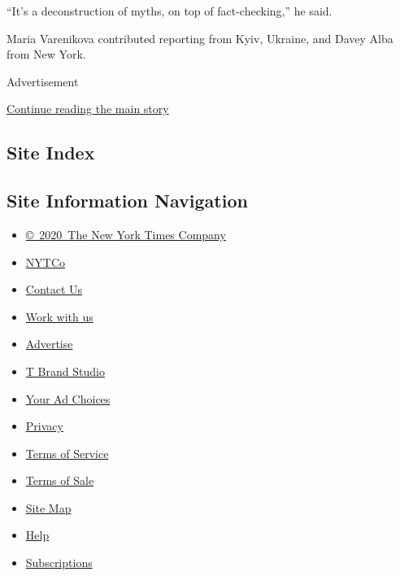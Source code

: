 ``It's a deconstruction of myths, on top of fact-checking,'' he said.

Maria Varenikova contributed reporting from Kyiv, Ukraine, and Davey
Alba from New York.

Advertisement

\protect\hyperlink{after-bottom}{Continue reading the main story}

\hypertarget{site-index}{%
\subsection{Site Index}\label{site-index}}

\hypertarget{site-information-navigation}{%
\subsection{Site Information
Navigation}\label{site-information-navigation}}

\begin{itemize}
\tightlist
\item
  \href{https://help.nytimes3xbfgragh.onion/hc/en-us/articles/115014792127-Copyright-notice}{©~2020~The
  New York Times Company}
\end{itemize}

\begin{itemize}
\tightlist
\item
  \href{https://www.nytco.com/}{NYTCo}
\item
  \href{https://help.nytimes3xbfgragh.onion/hc/en-us/articles/115015385887-Contact-Us}{Contact
  Us}
\item
  \href{https://www.nytco.com/careers/}{Work with us}
\item
  \href{https://nytmediakit.com/}{Advertise}
\item
  \href{http://www.tbrandstudio.com/}{T Brand Studio}
\item
  \href{https://www.nytimes3xbfgragh.onion/privacy/cookie-policy\#how-do-i-manage-trackers}{Your
  Ad Choices}
\item
  \href{https://www.nytimes3xbfgragh.onion/privacy}{Privacy}
\item
  \href{https://help.nytimes3xbfgragh.onion/hc/en-us/articles/115014893428-Terms-of-service}{Terms
  of Service}
\item
  \href{https://help.nytimes3xbfgragh.onion/hc/en-us/articles/115014893968-Terms-of-sale}{Terms
  of Sale}
\item
  \href{https://spiderbites.nytimes3xbfgragh.onion}{Site Map}
\item
  \href{https://help.nytimes3xbfgragh.onion/hc/en-us}{Help}
\item
  \href{https://www.nytimes3xbfgragh.onion/subscription?campaignId=37WXW}{Subscriptions}
\end{itemize}
